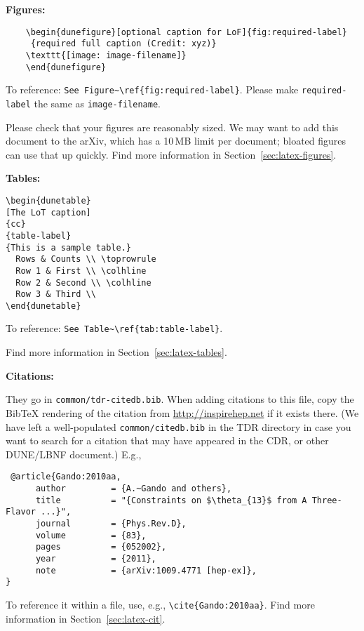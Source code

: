 \textbf{Figures:}

\begin{framed}
\begin{verbatim}
    \begin{dunefigure}[optional caption for LoF]{fig:required-label}
     {required full caption (Credit: xyz)}
    \texttt{[image: image-filename]}
    \end{dunefigure}
\end{verbatim}
To reference: \verb|See Figure~\ref{fig:required-label}|.
Please make \verb|required-label| the same as \verb|image-filename|. 

Please check that your figures are reasonably sized. We may want to add this document to the arXiv, which has a 10\,MB limit per document; bloated figures can use that up quickly. Find more information in Section~\ref{sec:latex-figures}.
\end{framed}

\textbf{Tables:}

\begin{framed}
\begin{verbatim}
\begin{dunetable}
[The LoT caption]
{cc}
{table-label}
{This is a sample table.}
  Rows & Counts \\ \toprowrule
  Row 1 & First \\ \colhline
  Row 2 & Second \\ \colhline
  Row 3 & Third \\ 
\end{dunetable}
\end{verbatim}
To reference: \verb|See Table~\ref{tab:table-label}|.

Find more information in Section~\ref{sec:latex-tables}.
\end{framed}
\textbf{Citations:}
\begin{framed}
They go in \texttt{common/tdr-citedb.bib}. When adding citations to this file, copy the BibTeX rendering of the citation from \url{http://inspirehep.net} if it exists there. (We have left a well-populated \texttt{common/citedb.bib} in the TDR directory in case you want to search for a citation
 that may have appeared in the CDR, or other DUNE/LBNF document.) E.g.,

\begin{verbatim}
 @article{Gando:2010aa,
      author         = {A.~Gando and others},
      title          = "{Constraints on $\theta_{13}$ from A Three-Flavor ...}",
      journal        = {Phys.Rev.D},
      volume         = {83},
      pages          = {052002},
      year           = {2011},
      note           = {arXiv:1009.4771 [hep-ex]},
}
\end{verbatim}
 To reference it within a file, use, e.g.,  \verb|\cite{Gando:2010aa}|.
Find more information in Section~\ref{sec:latex-cit}.
\end{framed}

